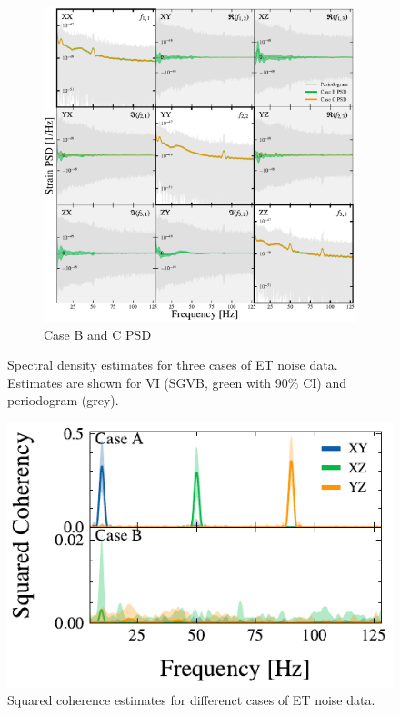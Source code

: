 \documentclass[%
 reprint,
 amsmath,amssymb,
 aps,
]{revtex4-2}
\begin{document}
\begin{figure}[h]
\begin{subfigure}{\columnwidth}
  \includegraphics[width=1.05\columnwidth]{caseBC_psd.pdf}
  \caption{Case B and C PSD}
  \label{fig:caseBC_psd}
\end{subfigure}
\caption{Spectral density estimates for three cases of ET noise data. Estimates are shown for VI (SGVB, green with 90\% CI) and periodogram (grey).}
\label{fig:test}
\end{figure}

\begin{figure}
  \includegraphics[width=\columnwidth]{caseAB_coh.pdf}
  \caption{Squared coherence estimates for differenct cases of ET noise data.}
  \label{caseAB_coh}
\end{figure}
\end{document}
